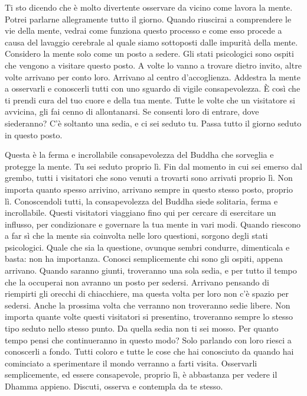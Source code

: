 Ti sto dicendo che è molto divertente osservare da vicino come lavora la
mente. Potrei parlarne allegramente tutto il giorno. Quando riuscirai a
comprendere le vie della mente, vedrai come funziona questo processo e
come esso procede a causa del lavaggio cerebrale al quale siamo
sottoposti dalle impurità della mente. Considero la mente solo come un
posto a sedere. Gli stati psicologici sono ospiti che vengono a visitare
questo posto. A volte lo vanno a trovare dietro invito, altre volte
arrivano per conto loro. Arrivano al centro d'accoglienza. Addestra la
mente a osservarli e conoscerli tutti con uno sguardo di vigile
consapevolezza. È così che ti prendi cura del tuo cuore e della tua
mente. Tutte le volte che un visitatore si avvicina, gli fai cenno di
allontanarsi. Se consenti loro di entrare, dove siederanno? C'è soltanto
una sedia, e ci sei seduto tu. Passa tutto il giorno seduto in questo
posto.

Questa è la ferma e incrollabile consapevolezza del Buddha che sorveglia
e protegge la mente. Tu sei seduto proprio lì. Fin dal momento in cui
sei emerso dal grembo, tutti i visitatori che sono venuti a trovarti
sono arrivati proprio lì. Non importa quanto spesso arrivino, arrivano
sempre in questo stesso posto, proprio lì. Conoscendoli tutti, la
consapevolezza del Buddha siede solitaria, ferma e incrollabile. Questi
visitatori viaggiano fino qui per cercare di esercitare un influsso, per
condizionare e governare la tua mente in vari modi. Quando riescono a
far sì che la mente sia coinvolta nelle loro questioni, sorgono degli
stati psicologici. Quale che sia la questione, ovunque sembri condurre,
dimenticala e basta: non ha importanza. Conosci semplicemente chi sono
gli ospiti, appena arrivano. Quando saranno giunti, troveranno una sola
sedia, e per tutto il tempo che la occuperai non avranno un posto per
sedersi. Arrivano pensando di riempirti gli orecchi di chiacchiere, ma
questa volta per loro non c'è spazio per sedersi. Anche la prossima
volta che verranno non troveranno sedie libere. Non importa quante volte
questi visitatori si presentino, troveranno sempre lo stesso tipo seduto
nello stesso punto. Da quella sedia non ti sei mosso. Per quanto tempo
pensi che continueranno in questo modo? Solo parlando con loro riesci a
conoscerli a fondo. Tutti coloro e tutte le cose che hai conosciuto da
quando hai cominciato a sperimentare il mondo verranno a farti visita.
Osservarli semplicemente, ed essere consapevole, proprio lì, è
abbastanza per vedere il Dhamma appieno. Discuti, osserva e contempla da
te stesso.

